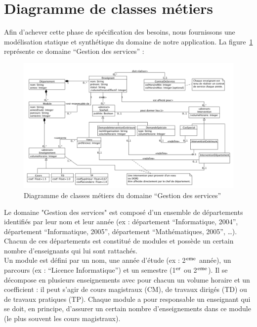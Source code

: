  \section{Diagramme de classes métiers}
Afin d'achever cette phase de spécification des besoins, nous fournissons une modélisation statique et synthétique du domaine de notre application. La figure~\ref{cls-metier} représente ce domaine ``Gestion des services'' : 

 \begin{figure}[!htb]
 \centering
 \includegraphics[width=18cm] {fig/ClassesMetiers.jpg}
 \caption{Diagramme de classes métiers du domaine ``Gestion des services''}
 \label{cls-metier}
 \end{figure}

 Le domaine "Gestion des services" est composé d'un ensemble de départements identifiés par leur nom et leur année (ex : département ``Informatique, 2004'', département ``Informatique, 2005'', département ``Mathématiques, 2005'', \dots). Chacun de ces départements est constitué de modules et possède un certain nombre d'enseignants qui lui sont rattachés.\\ 

 Un module est défini par un nom, une année d'étude (ex : 2$^{\textrm{\footnotesize{eme}}}$ année), un parcours (ex : ``Licence Informatique'') et un semestre (1$^{\textrm{\footnotesize{er}}}$ ou 2$^{\textrm{\footnotesize{eme}}}$). Il se décompose en plusieurs enseignements avec pour chacun un volume horaire et un coefficient : il peut s'agir de cours magistraux (CM), de travaux dirigés (TD) ou de travaux pratiques (TP). Chaque module a pour responsable un enseignant qui se doit, en principe, d'assurer un certain nombre d'enseignements dans ce module (le plus souvent les cours magistraux).\\

